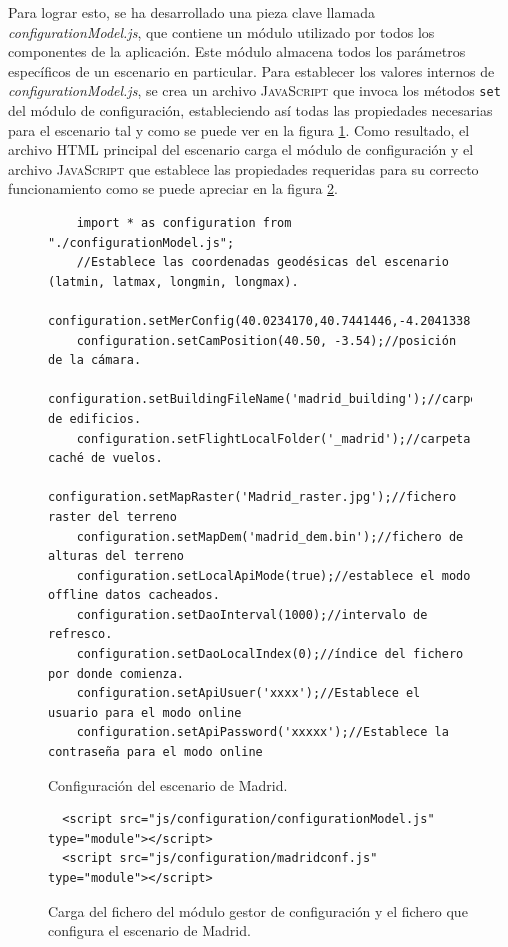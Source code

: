 \documentclass[a4paper, 11pt]{book}
\begin{document}
Para lograr esto, se ha desarrollado una pieza clave llamada \emph{configurationModel.js}, que contiene un módulo utilizado por todos los componentes de la aplicación. Este módulo almacena todos los parámetros específicos de un escenario en particular. Para establecer los valores internos de \emph{configurationModel.js}, se crea un archivo \textsc{JavaScript} que invoca los métodos \texttt{set} del módulo de configuración, estableciendo así todas las propiedades necesarias para el escenario tal y como se puede ver en la figura \ref{codigo:madridConf}. 
Como resultado, el archivo \textsc{HTML} principal del escenario carga el módulo de configuración y el archivo \textsc{JavaScript} que establece las propiedades requeridas para su correcto funcionamiento como se puede apreciar en la figura \ref{codigo:cargaConfiguracion}.
\begin{figure}[h]
\centering
\begin{verbatim}
    import * as configuration from "./configurationModel.js";
    //Establece las coordenadas geodésicas del escenario (latmin, latmax, longmin, longmax).
    configuration.setMerConfig(40.0234170,40.7441446,-4.2041338,-3.2538165);
    configuration.setCamPosition(40.50, -3.54);//posición de la cámara.
    configuration.setBuildingFileName('madrid_building');//carpeta de edificios.
    configuration.setFlightLocalFolder('_madrid');//carpeta caché de vuelos.
    configuration.setMapRaster('Madrid_raster.jpg');//fichero raster del terreno
    configuration.setMapDem('madrid_dem.bin');//fichero de alturas del terreno
    configuration.setLocalApiMode(true);//establece el modo offline datos cacheados.
    configuration.setDaoInterval(1000);//intervalo de refresco.
    configuration.setDaoLocalIndex(0);//índice del fichero por donde comienza.
    configuration.setApiUsuer('xxxx');//Establece el usuario para el modo online
    configuration.setApiPassword('xxxxx');//Establece la contraseña para el modo online
\end{verbatim}
\caption{Configuración del escenario de Madrid.
\label{codigo:madridConf}}
\end{figure}
\begin{figure}[h]
\centering
\begin{verbatim}
  <script src="js/configuration/configurationModel.js" type="module"></script>
  <script src="js/configuration/madridconf.js" type="module"></script>
\end{verbatim}
\caption{Carga del fichero del módulo gestor de configuración y el fichero que configura el escenario de Madrid.
\label{codigo:cargaConfiguracion}}
\end{figure}
\end{document}
